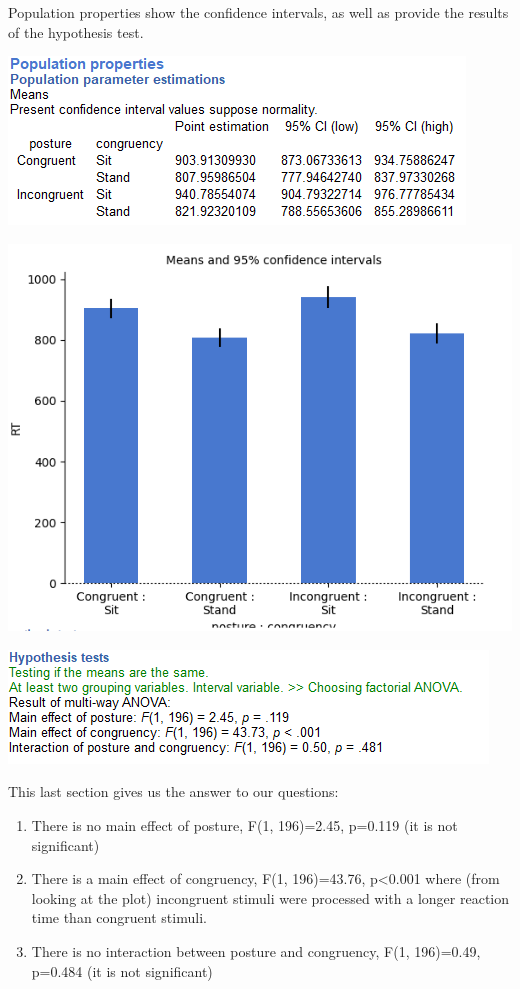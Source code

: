 \documentclass[
]{book}
\begin{document}
Population properties show the confidence intervals, as well as provide the results of the hypothesis test.

\includegraphics{img/ch10/10.3comparegroups_popprop.png}

\includegraphics{img/ch10/10.3comparegroups_CI.png}

\includegraphics{img/ch10/10.3comparegroups_hyptest.png}

This last section gives us the answer to our questions:

\begin{enumerate}
\def\labelenumi{\arabic{enumi}.}
\item
  There is no main effect of posture, F(1, 196)=2.45, p=0.119 (it is not significant)
\item
  There is a main effect of congruency, F(1, 196)=43.76, p\textless0.001 where (from looking at the plot) incongruent stimuli were processed with a longer reaction time than congruent stimuli.
\item
  There is no interaction between posture and congruency, F(1, 196)=0.49, p=0.484 (it is not significant)
\end{enumerate}
\end{document}
